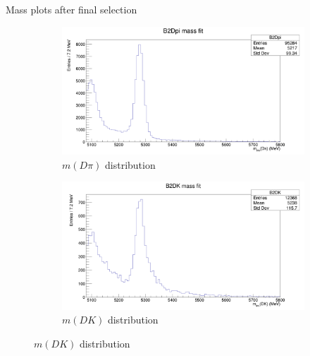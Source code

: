 \documentclass{beamer}
\begin{document}
\begin{frame}{Mass plots after final selection}
  \begin{figure}
    \centering
    \vspace{-0.2cm}
    \begin{subfigure}{0.5\textwidth}
      \includegraphics[width = 1.0\textwidth]{BMassAfterCutsB2DPi.png}
      \caption{$m(D\pi)$ distribution}
    \end{subfigure}%
    \begin{subfigure}{0.5\textwidth}
      \includegraphics[width = 1.0\textwidth]{BMassAfterCutsB2DK.png}
      \caption{$m(DK)$ distribution}
    \end{subfigure}
  \end{figure}
\end{frame}
\end{document}
